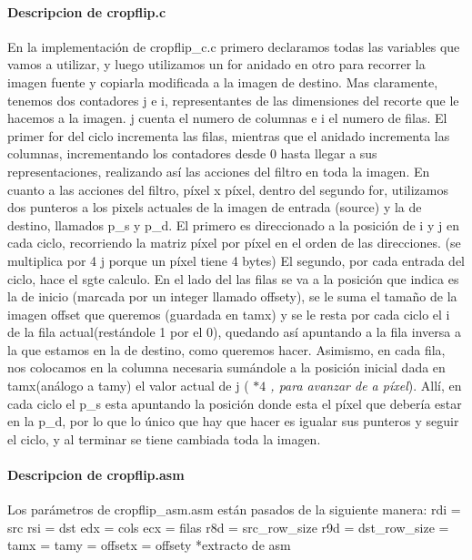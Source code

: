\documentclass[a4paper]{article}
\begin{document}
\paragraph{\textbf{Descripcion de cropflip.c}}
\hfill \break
        En la implementación de cropflip_c.c primero declaramos todas las variables que vamos a utilizar, y luego  utilizamos un for anidado en otro para recorrer la imagen fuente y copiarla modificada a la imagen de destino.
\hfill \break
        Mas claramente, tenemos dos contadores j e i, representantes de las dimensiones del recorte que le hacemos a la imagen. j cuenta el numero de columnas e i el numero de filas. El primer for del ciclo incrementa las filas, mientras que el anidado incrementa las columnas, incrementando los contadores desde 0 hasta llegar a sus representaciones, realizando así las acciones del filtro en toda la imagen.
\hfill \break   
         En cuanto a las acciones del filtro, píxel x píxel, dentro del segundo for, utilizamos dos punteros a los pixels actuales de la imagen de entrada (source) y la  de destino, llamados p_s y p_d.
\hfill \break 
         El primero es direccionado a la posición de i y j en cada ciclo, recorriendo la matriz píxel por píxel en el orden de las direcciones. (se multiplica por 4 j porque un píxel tiene 4 bytes) El segundo, por cada entrada del ciclo, hace el sgte calculo. En el lado del las filas se va a la posición que indica es la de inicio (marcada por un integer llamado offsety), se le suma el tamaño de la imagen offset que queremos (guardada en tamx) y se le resta por cada ciclo el i de la fila actual(restándole 1 por el 0), quedando así apuntando a la fila inversa a la que estamos en la de destino, como queremos hacer. Asimismo, en cada fila, nos colocamos en la columna necesaria sumándole a la posición inicial dada en tamx(análogo a tamy) el valor actual de j (\textit{ $*4$ , para avanzar de a píxel}).
         \hfill \break
Allí, en cada ciclo el p_s esta apuntando la posición donde esta el píxel que debería estar en la p_d, por lo que lo único que hay que hacer es igualar sus punteros y seguir el ciclo, y al terminar se tiene cambiada toda la imagen.
\hfill \break
\paragraph{\textbf{Descripcion de cropflip.asm}}
\hfill \break
        
        Los parámetros de cropflip_asm.asm están pasados de la siguiente manera:
        \hfill \break
         rdi = src
         \hfill \break
     rsi = dst
     \hfill \break 
     edx = cols
     \hfill \break
     ecx = filas
     \hfill \break
     r8d = src_row_size
     \hfill \break
     r9d = dst_row_size
     \hfill \break
     [rsp+8] = tamx
     \hfill \break
     [rsp+16] = tamy
     \hfill \break
     [rsp+24] = offsetx
     \hfill \break
     [rsp+32] = offsety
     \hfill \break
  *extracto de asm
  \hfill \break
     
\end{document}
